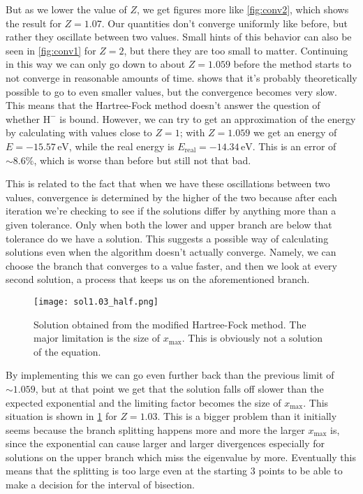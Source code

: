\documentclass[10pt,a4paper,twocolumn]{article}
\begin{document}
But as we lower the value of $Z$, we get figures more like \cref{fig:conv2}, which shows the result for $Z=1.07$. Our quantities don't converge uniformly like before, but rather they oscillate between two values. Small hints of this behavior can also be seen in \cref{fig:conv1} for $Z=2$, but there they are too small to matter. Continuing in this way we can only go down to about $Z=1.059$ before the method starts to not converge in reasonable amounts of time.  shows that it's probably theoretically possible to go to even smaller values, but the convergence becomes very slow. This means that the Hartree-Fock method doesn't answer the question of whether $\mathrm{H}^-$ is bound. However, we can try to get an approximation of the energy by calculating with values close to $Z=1$; with $Z = 1.059$ we get an energy of $E=-15.57\,\mathrm{eV}$, while the real energy is $E_{\mathrm{real}}=-14.34\,\mathrm{eV}$. This is an error of $\sim\! 8.6\%$, which is worse than before but still not that bad.

This is related to the fact that when we have these oscillations between two values, convergence is determined by the higher of the two because after each iteration we're checking to see if the solutions differ by anything more than a given tolerance. Only when both the lower and upper branch are below that tolerance do we have a solution. This suggests a possible way of calculating solutions even when the algorithm doesn't actually converge. Namely, we can choose the branch that converges to a value faster, and then we look at every second solution, a process that keeps us on the aforementioned branch.

\begin{figure}
    \centering
    \texttt{[image: sol1.03\_half.png]}
    \caption{Solution obtained from the modified Hartree-Fock method. The major limitation is the size of $x_{\mathrm{max}}$. This is obviously not a solution of the equation.}
    \label{fig:sol_1.03}
\end{figure}

By implementing this we can go even further back than the previous limit of $\sim\! 1.059$, but at that point we get that the solution falls off slower than the expected exponential and the limiting factor becomes the size of $x_{\mathrm{max}}$. This situation is shown in \cref{fig:sol_1.03} for $Z = 1.03$. This is a bigger problem than it initially seems because the branch splitting happens more and more the larger $x_{\mathrm{max}}$ is, since the exponential can cause larger and larger divergences especially for solutions on the upper branch which miss the eigenvalue by more. Eventually this means that the splitting is too large even at the starting $3$ points to be able to make a decision for the interval of bisection.
\end{document}
